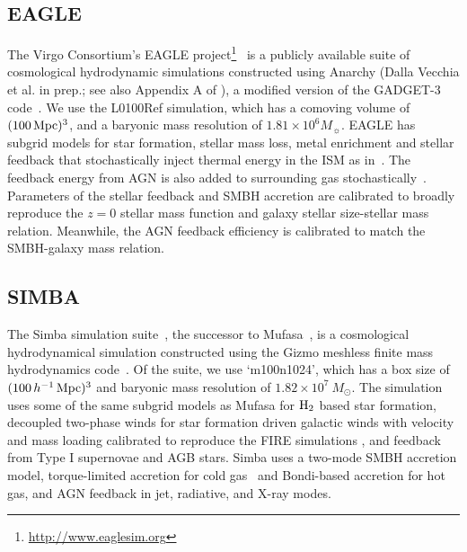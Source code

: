 \subsection{EAGLE} \label{sec:eagle} 
The Virgo Consortium's EAGLE
project\footnote{\url{http://www.eaglesim.org}}~\citep{schaye2015, crain2015,
mcalpine2016} is a publicly available suite of cosmological hydrodynamic
simulations constructed using {\sc Anarchy} (Dalla Vecchia et al. in prep.; 
see also Appendix A of \citealt{schaye2015}), a modified version of the 
{\sc GADGET-3} code~\citep{springel2005}. We use the L0100Ref simulation,
which has a comoving volume of $(100\,{\rm Mpc})^3$, and a baryonic mass resolution of $1.81\times 10^6M_{\sun}$. %
EAGLE has subgrid models for star formation, stellar mass loss, metal enrichment
and stellar feedback that stochastically inject thermal energy in the ISM as
in~\cite{dallavecchia2012}. The feedback energy from AGN is also added to
surrounding gas stochastically~\citep{booth2009}. Parameters of the stellar 
feedback and SMBH accretion are calibrated to broadly reproduce the $z=0$ 
stellar mass function and galaxy stellar size-stellar mass relation. Meanwhile, 
the AGN feedback efficiency is calibrated to match the SMBH-galaxy mass relation. 

\subsection{SIMBA} \label{sec:simba}
The {\sc Simba} simulation suite~\citep{dave2019}, the successor to {\sc
Mufasa}~\citep{dave2016, dave2017, dave2017a}, is a cosmological hydrodynamical
simulation constructed using the {\sc Gizmo} meshless finite mass hydrodynamics 
code~\citep{hopkins2015, hopkins2017}. Of the suite, we use
`m100n1024', which has a box size of $(100\,h^{-1}\,{\rm Mpc})^3$ and baryonic 
mass resolution of $1.82 \times 10^7\ M_\odot$. The simulation uses some of the same
subgrid models as {\sc Mufasa} for $\rm H_2$ based star formation, decoupled
two-phase winds for star formation driven galactic winds with velocity and mass loading 
calibrated to reproduce the FIRE simulations \citep{muratov2015, angles-alcazar2017b}, and feedback from 
Type I supernovae and AGB stars. {\sc Simba} uses a two-mode SMBH accretion 
model, torque-limited accretion for cold gas~\citep{angles-alcazar2017} and 
Bondi-based accretion for hot gas, and AGN feedback in jet, radiative, and
X-ray modes. %

